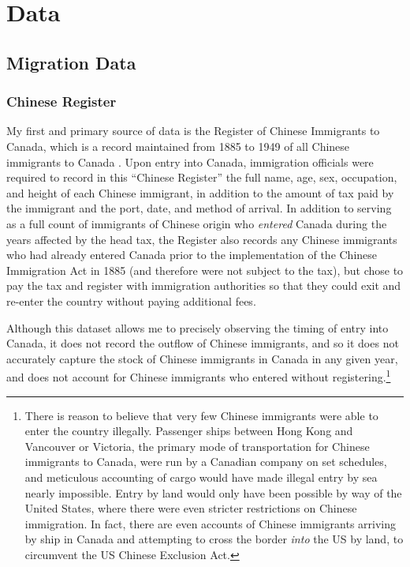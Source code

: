 \section{Data}
\subsection{Migration Data}
\subsubsection{Chinese Register}
My first and primary source of data is the Register of Chinese Immigrants to Canada, which is a record maintained from 1885 to 1949 of all Chinese immigrants to Canada \citep{chineseregister}. Upon entry into Canada, immigration officials were required to record in this ``Chinese Register'' the full name, age, sex, occupation, and height of each Chinese immigrant, in addition to the amount of tax paid by the immigrant and the port, date, and method of arrival.
In addition to serving as a full count of immigrants of Chinese origin who \textit{entered} Canada during the years affected by the head tax,
the Register also records any Chinese immigrants who had already entered Canada prior to the implementation of the Chinese Immigration Act in 1885 (and therefore were not subject to the tax),
but chose to pay the tax and register with immigration authorities so that they could exit and re-enter the country without paying additional fees.

Although this dataset allows me to precisely observing the timing of entry into Canada, it does not record the outflow of Chinese immigrants, and so it does not accurately capture the stock of Chinese immigrants in Canada in any given year, and does not account for Chinese immigrants who entered without registering.\footnote{There is reason to believe that very few Chinese immigrants were able to enter the country illegally. Passenger ships between Hong Kong and Vancouver or Victoria, the primary mode of transportation for Chinese immigrants to Canada, were run by a Canadian company on set schedules, and meticulous accounting of cargo would have made illegal entry by sea nearly impossible. 
Entry by land would only have been possible by way of the United States, where there were even stricter restrictions on Chinese immigration. In fact, there are even accounts of Chinese immigrants arriving by ship in Canada and attempting to cross the border \textit{into} the US by land, to circumvent the US Chinese Exclusion Act.}

